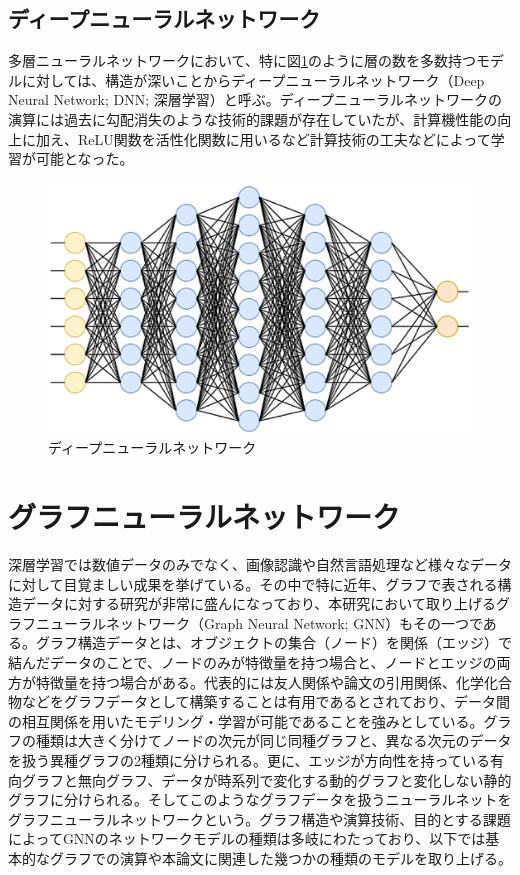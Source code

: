 \subsection{ディープニューラルネットワーク}
多層ニューラルネットワークにおいて、特に図\ref{dnn}のように層の数を多数持つモデルに対しては、構造が深いことからディープニューラルネットワーク（Deep Neural Network; DNN; 深層学習）と呼ぶ。ディープニューラルネットワークの演算には過去に勾配消失のような技術的課題が存在していたが、計算機性能の向上に加え、ReLU関数を活性化関数に用いるなど計算技術の工夫などによって学習が可能となった。
\begin{figure}[H]
	\begin{center}
 \includegraphics[keepaspectratio, scale=0.4]
 	{Figure/Deeplearning/dnn.png}
 		\caption{ディープニューラルネットワーク}
 		\label{dnn}
	\end{center}
\end{figure}
\section{グラフニューラルネットワーク}
深層学習では数値データのみでなく、画像認識や自然言語処理など様々なデータに対して目覚ましい成果を挙げている。その中で特に近年、グラフで表される構造データに対する研究が非常に盛んになっており、本研究において取り上げるグラフニューラルネットワーク（Graph Neural Network; GNN）\cite{gnnreview}もその一つである。グラフ構造データとは、オブジェクトの集合（ノード）を関係（エッジ）で結んだデータのことで、ノードのみが特徴量を持つ場合と、ノードとエッジの両方が特徴量を持つ場合がある。代表的には友人関係や論文の引用関係、化学化合物などをグラフデータとして構築することは有用であるとされており、データ間の相互関係を用いたモデリング・学習が可能であることを強みとしている。グラフの種類は大きく分けてノードの次元が同じ同種グラフと、異なる次元のデータを扱う異種グラフの2種類に分けられる。更に、エッジが方向性を持っている有向グラフと無向グラフ、データが時系列で変化する動的グラフと変化しない静的グラフに分けられる。そしてこのようなグラフデータを扱うニューラルネットをグラフニューラルネットワークという。グラフ構造や演算技術、目的とする課題によってGNNのネットワークモデルの種類は多岐にわたっており、以下では基本的なグラフでの演算や本論文に関連した幾つかの種類のモデルを取り上げる。

